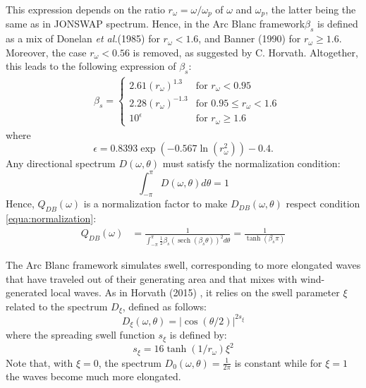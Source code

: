 \documentclass[final]{jcgt}
\def\Framework{The Arc Blanc framework\xspace}
\def\framework{the Arc Blanc framework\xspace}
\def\etal{\emph{et al.}\xspace}
\begin{document}
This expression depends on the ratio $r_{\omega}=\omega/\omega_p$ of $\omega$ and $\omega_p$, the latter being the same as in JONSWAP spectrum.
Hence, in \framework $\beta_s$ is defined as a mix of Donelan \etal (1985) \cite{donelanDirectionalSpectraWindgenerated1985} for $r_{\omega}<1.6$, and Banner (1990) \cite{bannerEquilibriumSpectraWind1990} for $r_{\omega}\geq1.6$.
Moreover, the case $r_{\omega}<0.56$ is removed, as suggested by C. Horvath.
Altogether, this leads to the following expression of $\beta_s$:
\begin{equation}
	\begin{aligned}
		 & \beta_s= \begin{cases}%
			            2.61\left(r_{\omega}\right)^{1.3}  & \text{for } r_{\omega}<0.95          \\
			            2.28\left(r_{\omega}\right)^{-1.3} & \text{for } 0.95 \leq r_{\omega}<1.6 \\
			            10^\epsilon                        & \text{for }  r_{\omega}\geq1.6       %
		            \end{cases}
	\end{aligned}
\end{equation}
where
\begin{equation}
	\epsilon=0.8393 \exp \left(-0.567\ln\left(r_{\omega}^2\right)\right)-0.4.
\end{equation}
Any directional spectrum $D(\omega,\theta)$ must satisfy the normalization condition:
\begin{equation}
	\label{equa:normalization}
	\int_{-\pi}^\pi D(\omega,\theta)d\theta = 1
\end{equation}
Hence, $Q_{DB}(\omega)$ is a normalization factor to make $D_{DB}(\omega, \theta)$ respect condition \ref{equa:normalization}:
\begin{equation}
	\begin{aligned}
		Q_{DB}(\omega) & = \frac{1}{\displaystyle\int_{-\pi}^\pi \frac{1}{2}\beta_s\left(\operatorname{sech}\left(\beta_s \theta\right)\right)^2 d\theta} = \frac{1}{\tanh\left(\beta_s\pi\right)}
	\end{aligned}
\end{equation}


\Framework simulates swell, corresponding to more elongated waves that have traveled out of their generating area and that mixes with wind-generated local waves.
As in Horvath (2015) \cite{horvathEmpiricalDirectionalWave2015}, it relies on the swell parameter $\xi$ related to the spectrum $D_{\xi}$, defined as follows:
\begin{equation}
	D_{\xi}(\omega, \theta)=|\cos (\theta / 2)|^{2 s_{\xi}}
\end{equation}
where the spreading swell function $s_\xi$ is defined by:
\begin{equation}
	s_\xi = 16 \tanh(1 / r_\omega) \xi^2
\end{equation}
Note that, with $\xi=0$, the spectrum $D_{0}(\omega, \theta)=\frac{1}{2\pi}$ is constant while for $\xi=1$ the waves become much more elongated.
\end{document}
